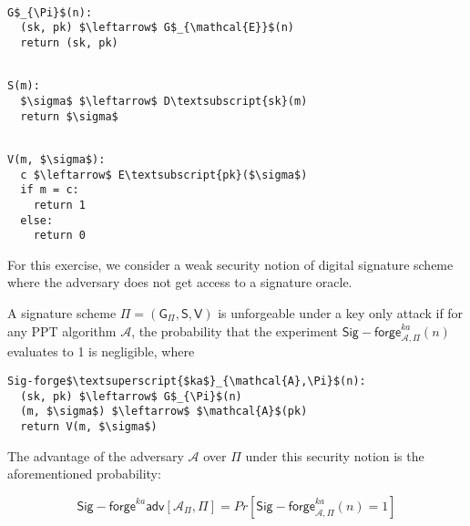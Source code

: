 \documentclass{article}
\begin{document}
\begin{minipage}[t][3.1cm][t]{.3\textwidth}
\begin{Verbatim}[commandchars=\\\{\},codes={\catcode`$=3\catcode`_=8}]

G$_{\Pi}$(n):
  (sk, pk) $\leftarrow$ G$_{\mathcal{E}}$(n)
  return (sk, pk)
\end{Verbatim}
\end{minipage}
\hfill
\begin{minipage}[t]{.3\textwidth}
\begin{Verbatim}[commandchars=\\\{\},codes={\catcode`$=3\catcode`_=8}]

S(m):
  $\sigma$ $\leftarrow$ D\textsubscript{sk}(m)
  return $\sigma$
\end{Verbatim}
\end{minipage}
\hfill
\begin{minipage}[t]{.3\textwidth}
\begin{Verbatim}[commandchars=\\\{\},codes={\catcode`$=3\catcode`_=8}]

V(m, $\sigma$):
  c $\leftarrow$ E\textsubscript{pk}($\sigma$)
  if m = c:
    return 1 
  else:
    return 0
\end{Verbatim}
\end{minipage}

For this exercise, we consider a weak security notion of digital signature
scheme where the adversary does not get access to a signature oracle.

A signature scheme $\Pi = (\mathsf{G}_{\Pi}, \mathsf{S}, \mathsf{V})$ is 
unforgeable under a key only attack if for any PPT algorithm $\mathcal{A}$,
the probability that the experiment 
$\mathsf{Sig-forge}^{ka}_{\mathcal{A},\Pi}(n)$ evaluates to 1 is negligible,
where

\begin{Verbatim}[commandchars=\\\{\},codes={\catcode`$=3\catcode`_=8}]
Sig-forge$\textsuperscript{$ka$}_{\mathcal{A},\Pi}$(n):
  (sk, pk) $\leftarrow$ G$_{\Pi}$(n)
  (m, $\sigma$) $\leftarrow$ $\mathcal{A}$(pk)
  return V(m, $\sigma$)
\end{Verbatim}

The advantage of the adversary $\mathcal{A}$ over $\Pi$ under this 
security notion is the aforementioned probability:

$$
\mathsf{Sig-forge}^{ka}\mathsf{adv}[\mathcal{A}_{\Pi}, \Pi] = 
  Pr[\mathsf{Sig-forge}^{ka}_{\mathcal{A},\Pi}(n) = 1]
$$
\end{document}
